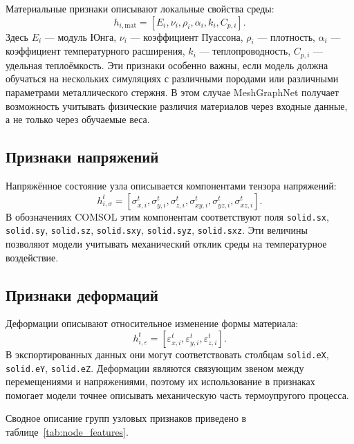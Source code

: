 Материальные признаки описывают локальные свойства среды:
\begin{equation}
    h_{i,\mathrm{mat}}=[E_i,\nu_i,\rho_i,\alpha_i,k_i,C_{p,i}].
\end{equation}
Здесь $E_i$ --- модуль Юнга, $\nu_i$ --- коэффициент Пуассона, $\rho_i$ --- плотность, $\alpha_i$ --- коэффициент температурного расширения, $k_i$ --- теплопроводность, $C_{p,i}$ --- удельная теплоёмкость. Эти признаки особенно важны, если модель должна обучаться на нескольких симуляциях с различными породами или различными параметрами металлического стержня. В этом случае MeshGraphNet получает возможность учитывать физические различия материалов через входные данные, а не только через обучаемые веса.

\subsection{Признаки напряжений}

Напряжённое состояние узла описывается компонентами тензора напряжений:
\begin{equation}
    h_{i,\sigma}^t=[\sigma_{x,i}^t,\sigma_{y,i}^t,\sigma_{z,i}^t,\sigma_{xy,i}^t,\sigma_{yz,i}^t,\sigma_{xz,i}^t].
\end{equation}
В обозначениях COMSOL этим компонентам соответствуют поля \texttt{solid.sx}, \texttt{solid.sy}, \texttt{solid.sz}, \texttt{solid.sxy}, \texttt{solid.syz}, \texttt{solid.sxz}. Эти величины позволяют модели учитывать механический отклик среды на температурное воздействие.

\subsection{Признаки деформаций}

Деформации описывают относительное изменение формы материала:
\begin{equation}
    h_{i,\varepsilon}^t=[\varepsilon_{x,i}^t,\varepsilon_{y,i}^t,\varepsilon_{z,i}^t].
\end{equation}
В экспортированных данных они могут соответствовать столбцам \texttt{solid.eX}, \texttt{solid.eY}, \texttt{solid.eZ}. Деформации являются связующим звеном между перемещениями и напряжениями, поэтому их использование в признаках помогает модели точнее описывать механическую часть термоупругого процесса.

Сводное описание групп узловых признаков приведено в таблице~\ref{tab:node_features}.

